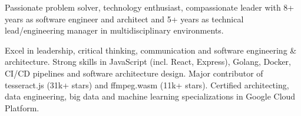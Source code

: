 

\begin{cvparagraph}

Passionate problem solver, technology enthusiast, compassionate leader with 8+ years as software engineer and architect and 5+ years as technical lead/engineering manager in multidisciplinary environments.

Excel in leadership, critical thinking, communication and software engineering & architecture. Strong skills in JavaScript (incl. React, Express), Golang, Docker, CI/CD pipelines and software architecture design. Major contributor of tesseract.js (31k+ stars) and ffmpeg.wasm (11k+ stars). Certified architecting, data engineering, big data and machine learning specializations in Google Cloud Platform.
\end{cvparagraph}
